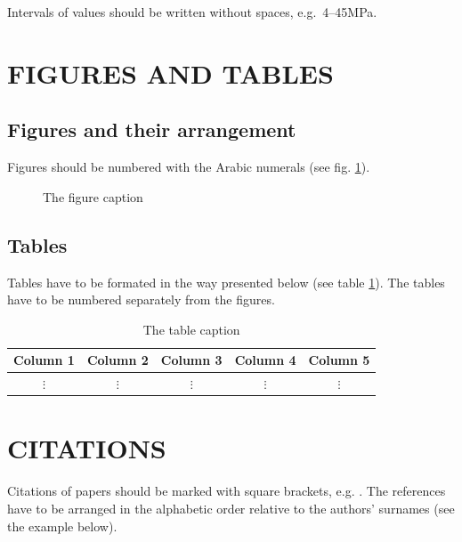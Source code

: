 \documentclass[11pt,twoside]{article}
\begin{document}
 \noindent
 Intervals of values should be written without spaces, e.g.\ 4--45MPa.


\section{FIGURES AND TABLES}

\subsection{Figures and their arrangement}

 Figures should be numbered with the Arabic numerals (see fig. 
 \ref{fig-example}). 

 \begin{figure}[hbtp]
  \fbox{\rule{0mm}{45mm}\rule{85mm}{0mm}}
  \caption{The figure caption}
  \label{fig-example}
 \end{figure}

\subsection{Tables}

 Tables have to be formated in the way presented below (see table 
 \ref{tab-example}). The tables have to be numbered  separately from 
 the figures.

 \begin{table}[hbtp]
  \caption{The table caption}
   \label{tab-example}
   \begin{tabular}{|c|c|c|c|c|}\hline
       Column 1 & Column 2 & Column 3 &  Column 4 & Column 5\\ \hline
       $\vdots$ & $\vdots$ & $\vdots$ & $\vdots$ & $\vdots$\\ \hline
    \end{tabular}
 \end{table}

\section{CITATIONS}

Citations of papers should be marked  with square brackets, e.g.
\cite{Ming}. The references have to be arranged in 
the alphabetic order relative to the authors' surnames (see the example
below).
\end{document}
